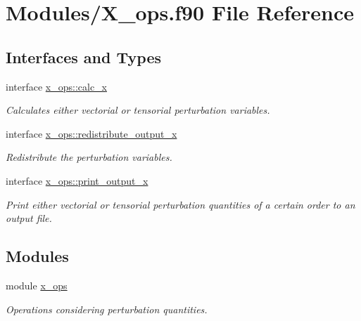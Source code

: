 \hypertarget{X__ops_8f90}{}\section{Modules/\+X\+\_\+ops.f90 File Reference}
\label{X__ops_8f90}
\subsection*{Interfaces and Types}
\begin{DoxyCompactItemize}
\item 
interface \hyperlink{interfacex__ops_1_1calc__x}{x\+\_\+ops\+::calc\+\_\+x}
\begin{DoxyCompactList}\small\item\em Calculates either vectorial or tensorial perturbation variables. \end{DoxyCompactList}\item 
interface \hyperlink{interfacex__ops_1_1redistribute__output__x}{x\+\_\+ops\+::redistribute\+\_\+output\+\_\+x}
\begin{DoxyCompactList}\small\item\em Redistribute the perturbation variables. \end{DoxyCompactList}\item 
interface \hyperlink{interfacex__ops_1_1print__output__x}{x\+\_\+ops\+::print\+\_\+output\+\_\+x}
\begin{DoxyCompactList}\small\item\em Print either vectorial or tensorial perturbation quantities of a certain order to an output file. \end{DoxyCompactList}\end{DoxyCompactItemize}
\subsection*{Modules}
\begin{DoxyCompactItemize}
\item 
module \hyperlink{namespacex__ops}{x\+\_\+ops}
\begin{DoxyCompactList}\small\item\em Operations considering perturbation quantities. \end{DoxyCompactList}\end{DoxyCompactItemize}
